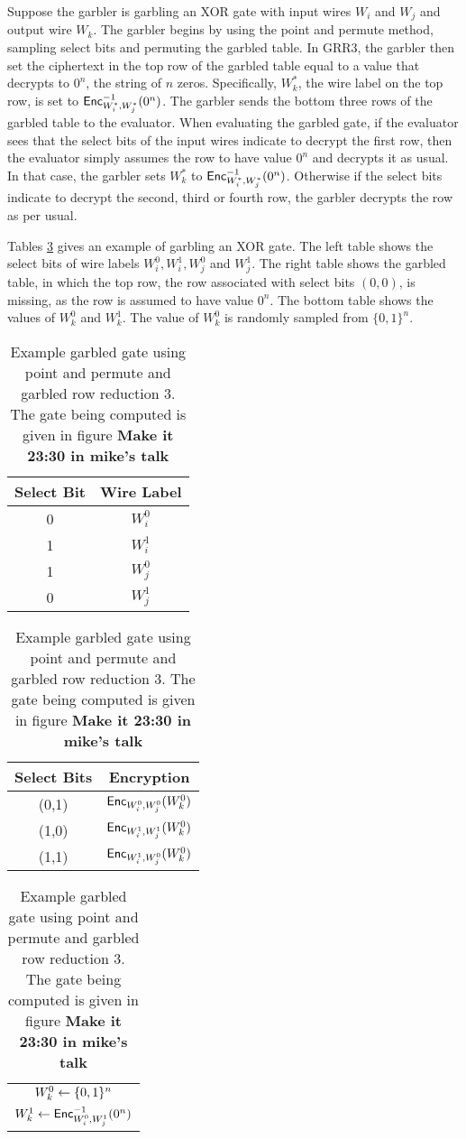 Suppose the garbler is garbling an XOR gate with input wires $W_i$ and $W_j$ and output wire $W_k$.
The garbler begins by using the point and permute method, sampling select bits and permuting the garbled table.
In GRR3, the garbler then set the ciphertext in the top row of the garbled table equal to a value that decrypts to $0^n$, the string of $n$ zeros.
Specifically, $W_k^*$, the wire label on the top row, is set to $\textsf{Enc}^{-1}_{W_i^*, W_j^*}(0^n)$.
The garbler sends the bottom three rows of the garbled table to the evaluator.
When evaluating the garbled gate, if the evaluator sees that the select bits of the input wires indicate to decrypt the first row, then the evaluator simply assumes the row to have value $0^n$ and decrypts it as usual.
In that case, the garbler sets $W_k^*$ to $\textsf{Enc}^{-1}_{W_i^*, W_j^*}(0^n)$.
Otherwise if the select bits indicate to decrypt the second, third or fourth row, the garbler decrypts the row as per usual.

Tables \ref{tbl:grr3} gives an example of garbling an XOR gate.
The left table shows the select bits of wire labels $W_i^0, W_i^1, W_j^0$ and $W_j^1$.
The right table shows the garbled table, in which the top row, the row associated with select bits $(0,0)$, is missing, as the row is assumed to have value $0^n$.
The bottom table shows the values of $W_k^0$ and $W_k^1$.
The value of $W_k^0$ is randomly sampled from $\{0,1\}^n$.

\begin{table}
    \centering
    \begin{tabular}{|c|c|}
        \hline
        Select Bit & Wire Label \\
        \hline
        0 & $W_i^0$ \\
        1 & $W_i^1$ \\
        1 & $W_j^0$ \\
        0 & $W_j^1$ \\
        \hline
    \end{tabular}
    \qquad
    \begin{tabular}{|c|c|}
        \hline
        Select Bits & Encryption \\
        \hline
        (0,1) & $\textsf{Enc}_{W_i^0, W_j^0}(W_k^0)$ \\
        (1,0) & $\textsf{Enc}_{W_i^1, W_j^1}(W_k^0)$ \\
        (1,1) & $\textsf{Enc}_{W_i^1, W_j^0}(W_k^0)$ \\
        \hline
    \end{tabular}
    \qquad
    \begin{tabular}{|c|}
        \hline
        $W_k^0 \gets \{0,1\}^n$ \\
        $W_k^1 \gets \textsf{Enc}_{W_i^0, W_j^1}^{-1}(0^n)$ \\
        \hline
    \end{tabular}
    \caption{Example garbled gate using point and permute and garbled row reduction 3. The gate being computed is given in figure \textbf{Make it 23:30 in mike's talk}}
    \label{tbl:grr3}
\end{table}

